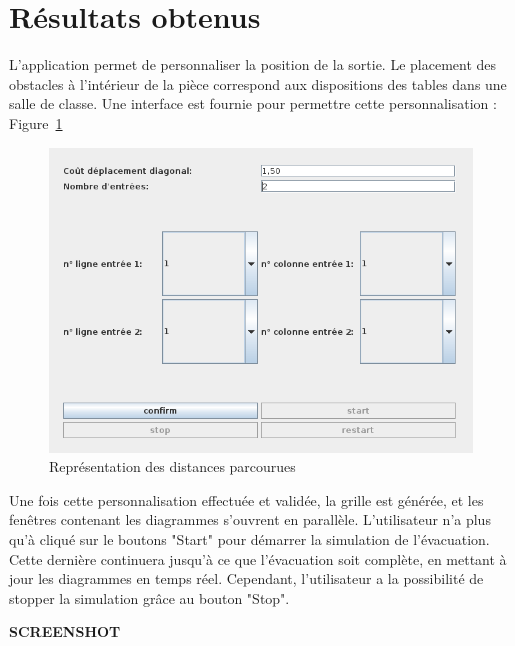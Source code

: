 \section{Résultats obtenus}
	L'application permet de personnaliser la position de la sortie. Le placement des obstacles à l'intérieur de la pièce correspond aux dispositions des tables dans une salle de classe. Une interface est fournie pour permettre cette personnalisation : Figure~\ref{fig:distances_parcourues}
		
	\begin{figure}[!H]
	\centering
	\includegraphics[scale=0.7]{imagesPNG/personnalisation.png}
	\caption{Représentation des distances parcourues\label{fig:distances_parcourues}}
	\end{figure}
		
	Une fois cette personnalisation effectuée et validée, la grille est générée, et les fenêtres contenant les diagrammes s'ouvrent en parallèle. L'utilisateur n'a plus qu'à cliqué sur le boutons "Start" pour démarrer la simulation de l'évacuation. Cette dernière continuera jusqu'à ce que l'évacuation soit complète, en mettant à jour les diagrammes en temps réel. Cependant, l'utilisateur a la possibilité de stopper la simulation grâce au bouton "Stop".
		
	\textbf{SCREENSHOT}